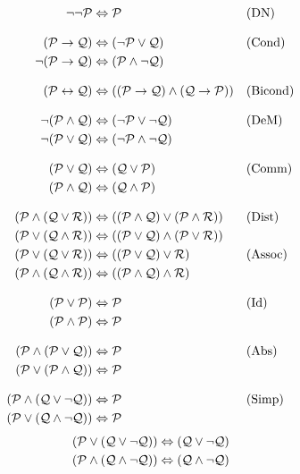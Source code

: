\begin{align*}
\lnot\lnot \mathcal{P} & \Leftrightarrow \mathcal{P} && \text{(DN)}\\[2ex]
(\mathcal{P} \rightarrow \mathcal{Q}) & \Leftrightarrow (\lnot \mathcal{P} \lor \mathcal{Q})
&& \text{(Cond)}\\
\lnot(\mathcal{P} \rightarrow \mathcal{Q}) & \Leftrightarrow (\mathcal{P} \land \lnot\mathcal{Q}) \\[2ex]
(\mathcal{P} \leftrightarrow \mathcal{Q}) & \Leftrightarrow ((\mathcal{P} \rightarrow \mathcal{Q}) \land  (\mathcal{Q} \rightarrow \mathcal{P}))
&& \text{(Bicond)}\\[2ex]
\lnot(\mathcal{P} \land \mathcal{Q}) & \Leftrightarrow (\lnot\mathcal{P} \lor \lnot\mathcal{Q})
&& \text{(DeM)}\\
\lnot(\mathcal{P} \lor \mathcal{Q}) & \Leftrightarrow (\lnot\mathcal{P} \land \lnot\mathcal{Q}) \\[2ex]
(\mathcal{P} \lor \mathcal{Q}) & \Leftrightarrow (\mathcal{Q} \lor \mathcal{P}) & &\text{(Comm)}\\
(\mathcal{P} \land \mathcal{Q}) & \Leftrightarrow (\mathcal{Q} \land \mathcal{P})\\[2ex]
(\mathcal{P} \land (\mathcal{Q} \lor \mathcal{R})) & \Leftrightarrow ((\mathcal{P} \land \mathcal{Q}) \lor (\mathcal{P} \land \mathcal{R}))
&& \text{(Dist)}\\
(\mathcal{P} \lor (\mathcal{Q} \land \mathcal{R})) & \Leftrightarrow ((\mathcal{P} \lor \mathcal{Q}) \land (\mathcal{P} \lor \mathcal{R}))\\
(\mathcal{P} \lor (\mathcal{Q} \lor \mathcal{R})) & \Leftrightarrow ((\mathcal{P} \lor \mathcal{Q}) \lor \mathcal{R}) & &\text{(Assoc)}\\
(\mathcal{P} \land (\mathcal{Q} \land \mathcal{R})) & \Leftrightarrow ((\mathcal{P} \land \mathcal{Q}) \land \mathcal{R})\\[2ex]
(\mathcal{P} \lor \mathcal{P}) & \Leftrightarrow \mathcal{P} && \text{(Id)}\\
(\mathcal{P} \land \mathcal{P}) & \Leftrightarrow \mathcal{P}\\[2ex]
(\mathcal{P} \land (\mathcal{P} \lor \mathcal{Q})) & \Leftrightarrow \mathcal{P}&& \text{(Abs)}\\
(\mathcal{P} \lor (\mathcal{P} \land \mathcal{Q})) & \Leftrightarrow \mathcal{P}\\[2ex]
(\mathcal{P} \land (\mathcal{Q} \lor \lnot\mathcal{Q})) & \Leftrightarrow \mathcal{P}  && \text{(Simp)}\\
(\mathcal{P} \lor (\mathcal{Q} \land \lnot\mathcal{Q})) & \Leftrightarrow \mathcal{P}
\end{align*}
\begin{align*}
(\mathcal{P} \lor (\mathcal{Q} \lor \lnot\mathcal{Q})) & \Leftrightarrow (\mathcal{Q} \lor \lnot\mathcal{Q}) \\
(\mathcal{P} \land (\mathcal{Q} \land \lnot\mathcal{Q})) & \Leftrightarrow (\mathcal{Q} \land \lnot\mathcal{Q})
\end{align*}
\fi
